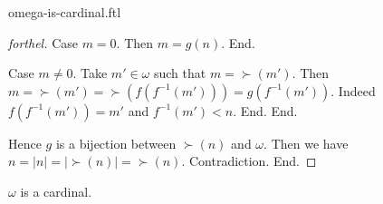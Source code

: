 \documentclass{naproche-library}
\begin{document}
\begin{smodule}{omega-is-cardinal.ftl}
\begin{proof}[forthel]
        Case $m = 0$.
          Then $m = g(n)$.
        End.

        Case $m \neq 0$.
          Take $m' \in \omega$ such that $m = \succ(m')$.
          Then $m
            = \succ(m')
            = \succ(f(f^{-1}(m')))
            = g(f^{-1}(m'))$.
          Indeed $f(f^{-1}(m')) = m'$ and $f^{-1}(m') < n$.
        End.
      End.

      Hence $g$ is a bijection between $\succ(n)$ and $\omega$.
      Then we have $n
        = |n|
        = |\succ(n)|
        = \succ(n)$.
      Contradiction.
    End.
  \end{proof}

  \begin{corollary}[forthel,id=SET_THEORY_07_2717623053713408]
    $\omega$ is a cardinal.
  \end{corollary}
\end{smodule}
\end{document}
